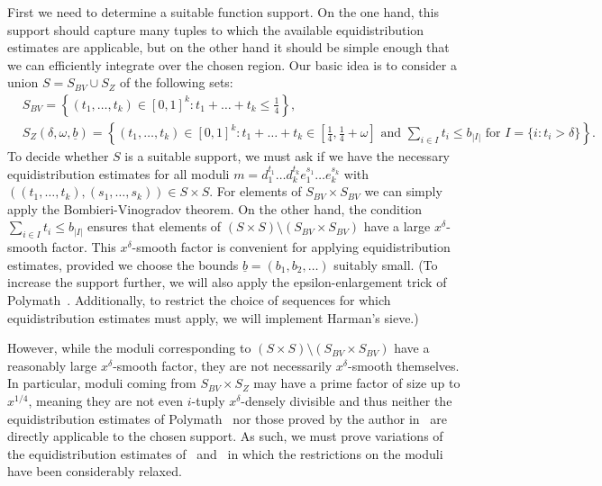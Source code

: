 \documentclass{amsart}
\numberwithin{equation}{section}
\begin{document}
 First we need to determine a suitable function support. On the one hand, this support should capture many tuples to which the available equidistribution estimates are applicable, but on the other hand it should be simple enough that we can efficiently integrate over the chosen  region.  Our basic idea is to consider a union $S=S_{BV} \cup S_{Z}$ of the following sets: 
 \begin{align*} 
 &S_{BV}=\left\{(t_1, \dots, t_k) \in [0,1]^k: t_1+\dots+t_k \leq \frac{1}{4}\right\}, \\
 &S_{Z}(\delta,\omega,\underline{b})=\left\{(t_1, \dots, t_k) \in [0,1]^k:    t_1+\dots+t_k \in \left[ \frac{1}{4},  \frac{1}{4}+\omega \right] \mbox{ and }  \sum_{i \in I} t_i \leq b_{|I|} \mbox{ for }  I=\{i: t_i > \delta\} \right\}.
 \end{align*}
 To decide whether $S$ is a suitable support, we must ask if we have the necessary  equidistribution estimates for all moduli $m = d_1^{t_1} \dots d_k^{t_k} e_1^{s_1} \dots e_k^{s_k}$ with $((t_1, \dots, t_k), (s_1, \dots, s_k)) \in S \times S$. For elements of $S_{BV} \times S_{BV}$ we can simply apply the   Bombieri-Vinogradov theorem. On the other hand, the condition $\sum_{i \in I} t_i \leq b_{|I|}$ ensures that elements of $(S \times S) \setminus (S_{BV} \times S_{BV})$ have a large $x^\delta$-smooth factor. This $x^\delta$-smooth factor is convenient for applying equidistribution estimates, provided we choose the bounds $ \underline{b} = (b_1, b_2, \dots)$ suitably small. 
 (To increase the support further, we will also apply the epsilon-enlargement trick of Polymath~\cite{Polymath:2014:VSS}. Additionally, to restrict the choice of sequences for which  equidistribution estimates  must apply, we will    implement Harman's sieve.)
 
 \medskip However, while the moduli corresponding to $(S \times S) \setminus (S_{BV} \times S_{BV})$ have a reasonably large  $x^\delta$-smooth factor, they are not necessarily $x^\delta$-smooth themselves. In particular, moduli coming from $S_{BV} \times S_Z$ may have a prime factor of size up to $x^{1/4}$, meaning they are not   even $i$-tuply $x^\delta$-densely divisible and thus neither the equidistribution estimates of Polymath~\cite{Polymath:2014:EDZ} nor those proved by the author in~\cite{Stadlmann:2023:PAP} are directly applicable to the chosen support. As such, we must prove variations of the equidistribution estimates of~\cite{Polymath:2014:EDZ} and~\cite{Stadlmann:2023:PAP} in which the restrictions on the moduli have been considerably relaxed.  
 
\end{document}
